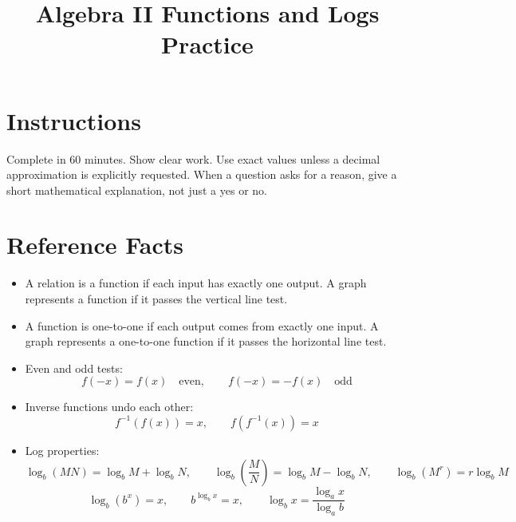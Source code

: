 \documentclass[12pt]{article}
\title{Algebra II Functions and Logs Practice}
\author{}
\date{}
\begin{document}
\maketitle

\section*{Instructions}
Complete in 60 minutes. Show clear work. Use exact values unless a decimal approximation is explicitly requested. When a question asks for a reason, give a short mathematical explanation, not just a yes or no.

\section*{Reference Facts}
\begin{itemize}[leftmargin=1.5em]
  \item A relation is a function if each input has exactly one output. A graph represents a function if it passes the vertical line test.
  \item A function is one-to-one if each output comes from exactly one input. A graph represents a one-to-one function if it passes the horizontal line test.
  \item Even and odd tests:
  \[
  f(-x)=f(x)\quad \text{even},\qquad f(-x)=-f(x)\quad \text{odd}
  \]
  \item Inverse functions undo each other:
  \[
  f^{-1}(f(x))=x,\qquad f(f^{-1}(x))=x
  \]
  \item Log properties:
  \[
  \log_b(MN)=\log_bM+\log_bN,\qquad
  \log_b\!\left(\frac{M}{N}\right)=\log_bM-\log_bN,\qquad
  \log_b(M^r)=r\log_bM
  \]
  \[
  \log_b(b^x)=x,\qquad b^{\log_b x}=x,\qquad
  \log_b x=\frac{\log_a x}{\log_a b}
  \]
\end{itemize}
\end{document}
